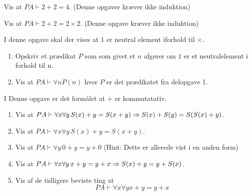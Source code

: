 \ifx\preampleIncluded\undefined
\def\startOpgaverPeano{}


\fi
\begin{opg}
    Vis at $PA \vdash 2+2 = 4$. (Denne opgaver kræver ikke induktion)
\end{opg}

\begin{opg}
    Vis at $PA \vdash 2+2 = 2 \times 2$. (Denne opgave kræver ikke induktion)
\end{opg}

\begin{opg}
    I denne opgave skal der vises at $1$ er neutral element iforhold til $\times$.
    \begin{enumerate}
        \item Opskriv et prædikat $P$ som som givet et $n$ afgører om $1$ er et neutralelement i forhold til n.
        \item Vis at $PA \vdash \forall n P(n)$ hvor $P$ er det prædikatet fra delopgave 1.
    \end{enumerate}
\end{opg}

\begin{opg}
    I Denne opgave er det formålet at $+$ er kommutatativ.
    \begin{enumerate}
        \item Vis at $PA \vdash \forall x \forall y \, S(x) + y = S(x + y) \Rightarrow S(x) + S(y) = S(S(x) + y)$.
        \item Vis at $PA \vdash \forall x \forall y \, S(x) + y = S(x + y)$.
        \item Vis at $PA \vdash \forall y \, 0+y=y+0$ (Hint: Dette er allerede vist i en anden form)
        \item Vis at $PA \vdash \forall x \forall y \, x+y = y+x \Rightarrow S(x) + y = y + S(x)$.
        \item Vis af de tidligere beviste ting at 
            \[PA \vdash \forall x \forall y x+y = y+x \]
    \end{enumerate}
\end{opg}

\ifdefined\startOpgaverPeano\fi
